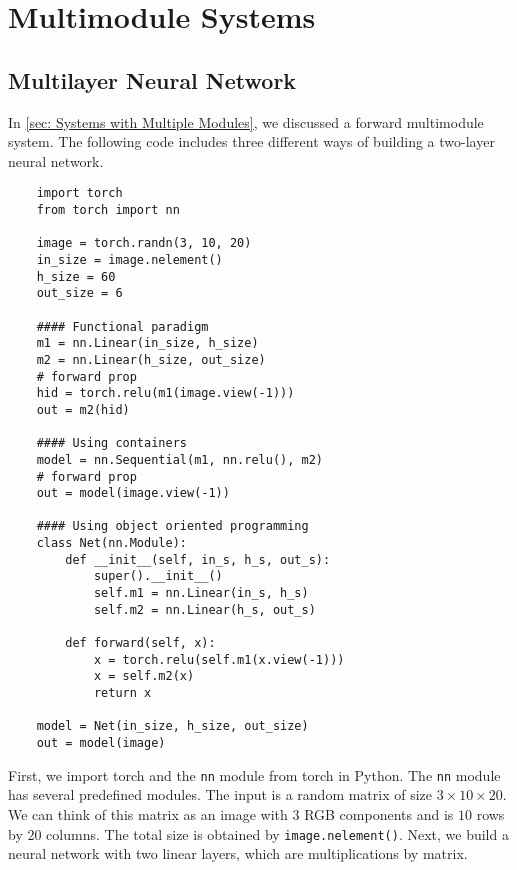 \chapter{Multimodule Systems}

\section{Multilayer Neural Network}\label{sec: Multilayer Neural Network}

In \cref{sec: Systems with Multiple Modules}, we discussed a forward multimodule system.
The following code includes three different ways of building a two-layer neural network.

\begin{verbatim}
    import torch 
    from torch import nn
    
    image = torch.randn(3, 10, 20)
    in_size = image.nelement()
    h_size = 60
    out_size = 6
    
    #### Functional paradigm 
    m1 = nn.Linear(in_size, h_size)
    m2 = nn.Linear(h_size, out_size)
    # forward prop
    hid = torch.relu(m1(image.view(-1)))
    out = m2(hid)
    
    #### Using containers
    model = nn.Sequential(m1, nn.relu(), m2)
    # forward prop
    out = model(image.view(-1))
    
    #### Using object oriented programming 
    class Net(nn.Module):
        def __init__(self, in_s, h_s, out_s):
            super().__init__()
            self.m1 = nn.Linear(in_s, h_s)
            self.m2 = nn.Linear(h_s, out_s)
            
        def forward(self, x):
            x = torch.relu(self.m1(x.view(-1)))
            x = self.m2(x)
            return x
            
    model = Net(in_size, h_size, out_size)
    out = model(image)
\end{verbatim}

First, we import torch and the \texttt{nn} module from torch in Python.
The \texttt{nn} module has several predefined modules.
The input is a random matrix of size $3 \times 10 \times 20$.
We can think of this matrix as an image with $3$ RGB components and is $10$ rows by $20$ columns.
The total size is obtained by \texttt{image.nelement()}.
Next, we build a neural network with two linear layers, which are multiplications by matrix.

